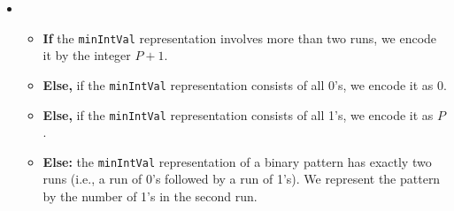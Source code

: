 \documentclass{article}
\begin{document}
\begin{itemize}
    \item \begin{itemize}
        \item \textbf{If} the \texttt{minIntVal} representation involves more than two runs, we encode it by the integer \( P + 1 \).
        \item \textbf{Else,} if the \texttt{minIntVal} representation consists of all 0's, we encode it as 0.
        \item \textbf{Else,} if the \texttt{minIntVal} representation consists of all 1's, we encode it as \( P \).
        \item \textbf{Else:} the \texttt{minIntVal} representation of a binary pattern has exactly two runs (i.e., a run of 0's followed by a run of 1's). We represent the pattern by the number of 1's in the second run.
    \end{itemize}
\end{itemize}
\end{document}
